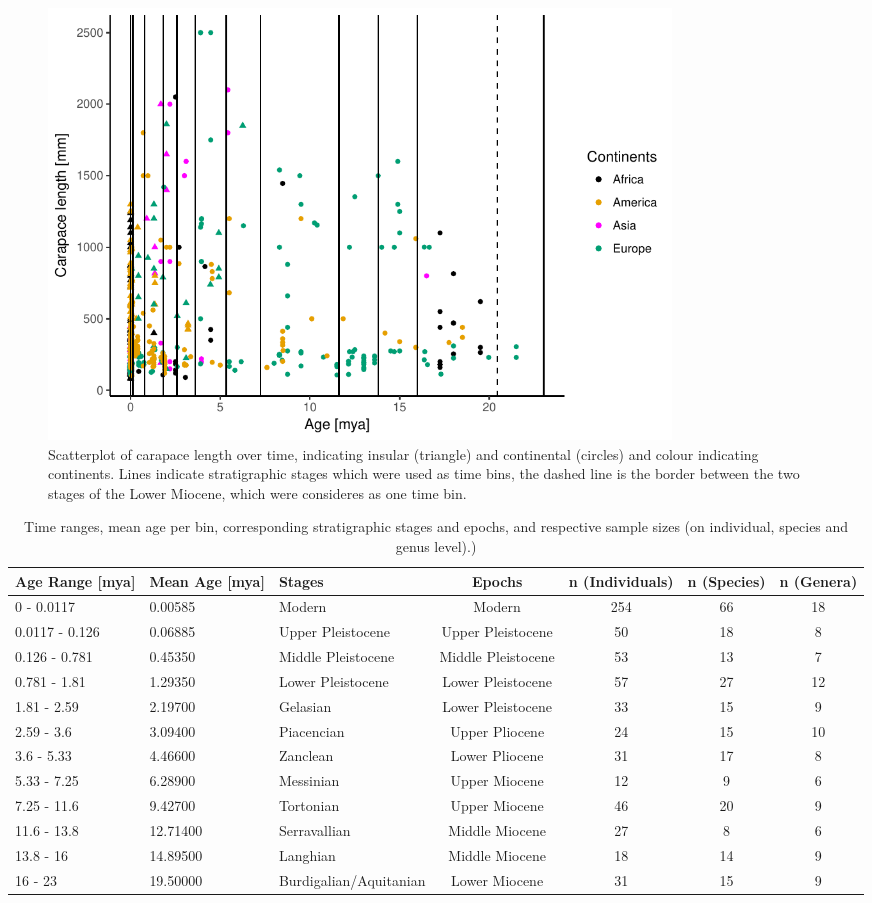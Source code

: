 \begin{figure}[htbp]
	\centering
	\includegraphics[width=0.8\textwidth]{MA_JJ_files/figure-latex/overviewData-1.pdf}
	\caption[Carapace length over time]{Scatterplot of carapace length over time, indicating insular
		(triangle) and continental (circles) and colour indicating continents.
		Lines indicate stratigraphic stages which were used as time bins, the
		dashed line is the border between the two stages of the Lower Miocene,
		which were consideres as one time bin.}
	\label{fig:bins}
\end{figure}


\begin{landscape}\label{data}
	\begin{longtable}[]{@{}lllcccc@{}}
		\caption[Sample sizes per time bins]{Time ranges, mean age per bin, corresponding stratigraphic stages and epochs, and respective sample sizes (on individual, species and genus level).)}
		\label{tab:bins}\tabularnewline
		\toprule
		Age Range [mya] & Mean Age [mya] & Stages & Epochs & n (Individuals) & n (Species) & n (Genera)\tabularnewline
		\midrule
		\endhead
		0 - 0.0117 & 0.00585 & Modern & Modern & 254 & 66 & 18\tabularnewline
		0.0117 - 0.126 & 0.06885 & Upper Pleistocene & Upper Pleistocene & 50
		& 18 & 8\tabularnewline
		0.126 - 0.781 & 0.45350 & Middle Pleistocene & Middle Pleistocene & 53
		& 13 & 7\tabularnewline
		0.781 - 1.81 & 1.29350 & Lower Pleistocene & Lower Pleistocene & 57 &
		27 & 12\tabularnewline
		1.81 - 2.59 & 2.19700 & Gelasian & Lower Pleistocene & 33 & 15 &
		9\tabularnewline
		2.59 - 3.6 & 3.09400 & Piacencian & Upper Pliocene & 24 & 15 &
		10\tabularnewline
		3.6 - 5.33 & 4.46600 & Zanclean & Lower Pliocene & 31 & 17 &
		8\tabularnewline
		5.33 - 7.25 & 6.28900 & Messinian & Upper Miocene & 12 & 9 &
		6\tabularnewline
		7.25 - 11.6 & 9.42700 & Tortonian & Upper Miocene & 46 & 20 &
		9\tabularnewline
		11.6 - 13.8 & 12.71400 & Serravallian & Middle Miocene & 27 & 8 &
		6\tabularnewline
		13.8 - 16 & 14.89500 & Langhian & Middle Miocene & 18 & 14 &
		9\tabularnewline
		16 - 23 & 19.50000 & Burdigalian/Aquitanian & Lower Miocene & 31 & 15 & 9\tabularnewline
		\bottomrule
	\end{longtable}
\end{landscape}






\FloatBarrier

